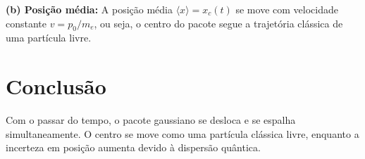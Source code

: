 \documentclass[a4paper,12pt]{article}
\begin{document}
\textbf{(b) Posição média:}  
A posição média $\langle x \rangle = x_c(t)$ se move com velocidade constante $v = p_0/m_e$, ou seja, o centro do pacote segue a trajetória clássica de uma partícula livre.

\section*{Conclusão}

Com o passar do tempo, o pacote gaussiano se desloca e se espalha simultaneamente.  
O centro se move como uma partícula clássica livre, enquanto a incerteza em posição aumenta devido à dispersão quântica.
\end{document}
